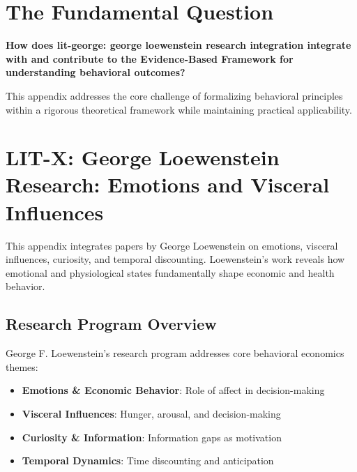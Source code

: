 \section{The Fundamental Question}
\label{sec:loe-fundamental}

\begin{tcolorbox}[
    colback=red!5!white,
    colframe=red!75!black,
    title={\textbf{Fundamental Question}}
]
\textbf{How does lit-george: george loewenstein research integration integrate with and contribute to the
Evidence-Based Framework for understanding behavioral outcomes?}

This appendix addresses the core challenge of formalizing behavioral principles
within a rigorous theoretical framework while maintaining practical applicability.
\end{tcolorbox}




\section{LIT-X: George Loewenstein Research: Emotions and Visceral Influences}
\label{app:litx}

This appendix integrates papers by George Loewenstein on emotions, visceral
influences, curiosity, and temporal discounting. Loewenstein's work reveals how emotional and
physiological states fundamentally shape economic and health behavior.

\subsection{Research Program Overview}

George F. Loewenstein's research program addresses core behavioral economics themes:

\begin{itemize}
  \item \textbf{Emotions & Economic Behavior}: Role of affect in decision-making
  \item \textbf{Visceral Influences}: Hunger, arousal, and decision-making
  \item \textbf{Curiosity & Information}: Information gaps as motivation
  \item \textbf{Temporal Dynamics}: Time discounting and anticipation
\end{itemize}

